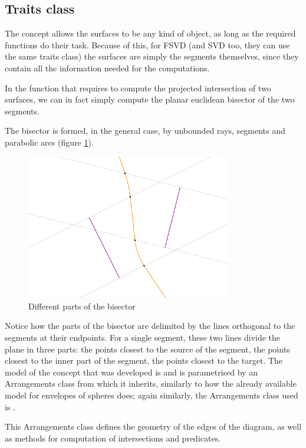 \documentclass[11pt,a4paper,english]{article}
\begin{document}
	\subsection{Traits class }
	The  concept allows the surfaces to be any kind of object, as long as the required functions do their task. Because of this, for FSVD (and SVD too, they can use the same traits class) the surfaces are simply the segments themselves, since they contain all the information needed for the computations.\par
	In the function that requires to compute the projected intersection of two surfaces, we can in fact simply compute the planar euclidean bisector of the two segments.\par
	The bisector is formed, in the general case, by unbounded rays, segments and parabolic arcs (figure \ref{fig:areas_of_influence}).\ppar
	\begin{figure}[h]
    \centering
    \includegraphics[width=0.8\textwidth]{areas_of_influence}
    \caption{Different parts of the bisector\label{fig:areas_of_influence}}
	\end{figure}
	Notice how the parts of the bisector are delimited by the lines orthogonal to the segments at their endpoints. For a single segment, these two lines divide the plane in three parts: the points closest to the source of the segment, the points closest to the inner part of the segment, the points closest to the target.\ppar
	The model of the concept  that was developed is   and is parametrised by an Arrangements class from which it inherits, similarly to how the already available model  for envelopes of spheres does; again similarly, the Arrangements class used is .\par
	This Arrangements class defines the geometry of the edges of the diagram, as well as methods for computation of intersections and predicates.
	
\end{document}
